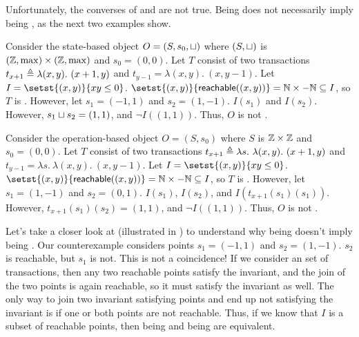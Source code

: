 Unfortunately, the converses of  and
 are not true. Being \Iconfluent{} does not
necessarily imply being \Iclosed{}, as the next two examples show.

\begin{example}
  Consider the state-based object $O = (S, s_0, \sqcup)$ where $(S, \sqcup)$ is
  $(\mathbb{Z}, \max) \times (\mathbb{Z}, \max)$ and $s_0 = (0, 0)$. Let $T$ consist of
  two transactions $t_{x+1} \triangleq \lambda (x, y).\ (x + 1, y)$ and $t_{y-1} =
  \lambda (x, y).\ (x, y - 1)$. Let $I = \setst{(x, y)}{xy \leq 0}$.
  $\setst{(x, y)}{\reachable{(x, y)}} = \nats \times -\nats \subseteq I$, so
  $T$ is \Iconfluent. However, let $s_1 = (-1, 1)$ and $s_2 = (1, -1)$.
  $I(s_1)$ and $I(s_2)$. However, $s_1 \sqcup s_2 = (1, 1)$, and $\lnot I((1,
  1))$. Thus, $O$ is not \Iclosed{}.
\end{example}

\begin{example}
  Consider the operation-based object $O = (S, s_0)$ where $S$ is $\mathbb{Z} \times
  \mathbb{Z}$ and $s_0 = (0, 0)$. Let $T$ consist of two transactions $t_{x+1}
  \triangleq \lambda s.\ \lambda (x, y).\ (x + 1, y)$ and $t_{y-1} = \lambda s.\
  \lambda (x, y).\ (x, y - 1)$. Let $I = \setst{(x, y)}{xy \leq 0}$.
  $\setst{(x, y)}{\reachable{(x, y)}} = \nats \times -\nats \subseteq I$, so
  $T$ is \Iconfluent. However, let $s_1 = (1, -1)$ and $s_2 = (0, 1)$.
  $I(s_1)$, $I(s_2)$, and $I(t_{x+1}(s_1)(s_1))$. However, $t_{x+1}(s_1)(s_2) =
  (1, 1)$, and $\lnot I((1, 1))$. Thus, $O$ is not \Iclosed{}.
\end{example}



Let's take a closer look at  (illustrated in
\figref{statebasednotnecessary}) to understand why being \Iconfluent{} doesn't
imply being \Iclosed{}. Our counterexample considers points $s_1 = (-1, 1)$ and
$s_2 = (1, -1)$. $s_2$ is reachable, but $s_1$ is not. This is not a
coincidence! If we consider an \Iconfluent{} set of transactions, then any two
reachable points satisfy the invariant, and the join of the two points is again
reachable, so it must satisfy the invariant as well. The only way to join two
invariant satisfying points and end up not satisfying the invariant is if one
or both points are not reachable. Thus, if we know that $I$ is a subset of
reachable points, then being \Iconfluent{} and being \Iclosed{} are equivalent.


